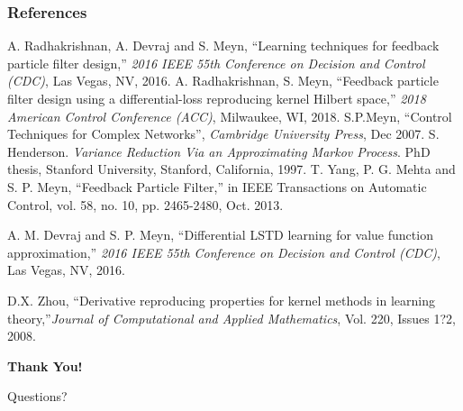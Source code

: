 \documentclass[xcolor=dvipsnames, subsection=false]{beamer}
\def\alertb#1{\alert{\color{BrickRed}  #1}}
\def\alertb#1{\alert{\color{BrickRed}  #1}}
\begin{document}
\begin{frame}
\frametitle{References}

\begin{thebibliography}{10}
	\tiny
	A. Radhakrishnan, A. Devraj and S. Meyn, ``Learning techniques for feedback particle filter design,'' \textit{ 2016 IEEE 55th Conference on Decision and Control (CDC)}, Las Vegas, NV, 2016.
	A. Radhakrishnan, S. Meyn, ``Feedback particle filter design using a differential-loss reproducing kernel Hilbert space,'' \textit{2018 American Control Conference (ACC)}, Milwaukee, WI, 2018.
	S.P.Meyn, ``Control Techniques for Complex Networks'', \textit{Cambridge University Press}, Dec 2007.
	S. Henderson. \textit{Variance Reduction Via an Approximating Markov Process}. PhD thesis, Stanford University, Stanford, California, 1997.
	T. Yang, P. G. Mehta and S. P. Meyn, ``Feedback Particle Filter,'' in IEEE Transactions on Automatic Control, vol. 58, no. 10, pp. 2465-2480, Oct. 2013.
	
	A. M. Devraj and S. P. Meyn, ``Differential LSTD learning for value function approximation,'' \textit{2016 IEEE 55th Conference on Decision and Control (CDC)}, Las Vegas, NV, 2016.
	
	D.X. Zhou,
``Derivative reproducing properties for kernel methods in learning theory,''\textit{Journal of Computational and Applied Mathematics},
 Vol. 220, Issues 1?2,
	2008.
	
\end{thebibliography}
\end{frame}



\begin{frame}
\centerline{\bf \huge \color{OrangeRed} Thank You!}
\vfill
\centerline{\huge \alertb{Questions?}}
\vfill
\end{frame}
\end{document}
